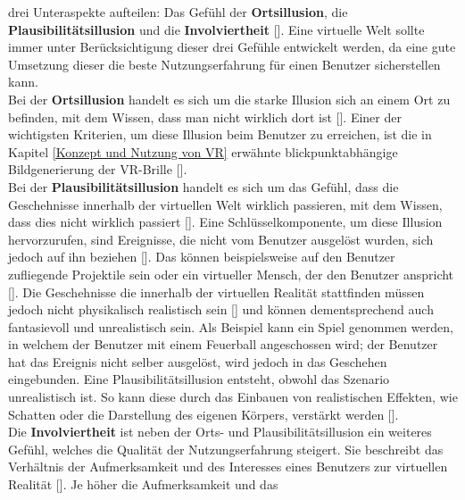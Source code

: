 \documentclass[a4paper,12pt,oneside]{article}
\begin{document}
        drei Unteraspekte aufteilen: Das Gefühl der \textbf{Ortsillusion}, die \textbf{Plausibilitätsillusion}
        und die \textbf{Involviertheit} [\cite[18-19]{Dorner2013}]. Eine virtuelle Welt sollte immer unter
        Berücksichtigung dieser drei Gefühle entwickelt werden, da eine gute Umsetzung
        dieser die beste Nutzungserfahrung für einen Benutzer sicherstellen kann. \\
        Bei der 
        \textbf{Ortsillusion} handelt es sich um die starke Illusion sich an einem Ort zu befinden, 
        mit dem Wissen, dass man nicht wirklich dort ist [\cite{Slater2009}]. 
        Einer der wichtigsten
        Kriterien, um diese Illusion beim Benutzer zu erreichen, ist die in Kapitel 
        \ref{Konzept und Nutzung von VR}
        erwähnte blickpunktabhängige Bildgenerierung der VR-Brille [\cite[18]{Dorner2013}]. \\
        Bei der \textbf{Plausibilitätsillusion} handelt
        es sich um das Gefühl, dass die Geschehnisse innerhalb der virtuellen Welt 
        wirklich passieren, mit dem Wissen, dass dies nicht wirklich passiert
        [\cite{Slater2009}]. Eine Schlüsselkomponente, um diese Illusion hervorzurufen,
        sind Ereignisse, die nicht vom Benutzer ausgelöst wurden, sich jedoch auf ihn
        beziehen [\cite{Slater2009}]. Das können beispielsweise auf den Benutzer zufliegende
        Projektile sein oder ein virtueller Mensch, der den Benutzer anspricht
        [\cite[18-19]{Dorner2013}]. Die Geschehnisse die innerhalb der virtuellen Realität
        stattfinden müssen jedoch nicht physikalisch realistisch sein [\cite{Slater2009}]
        und können dementsprechend auch fantasievoll und unrealistisch sein. Als Beispiel kann
        ein Spiel genommen werden, in welchem der Benutzer mit einem 
        Feuerball angeschossen wird; der Benutzer hat das Ereignis nicht selber ausgelöst,
        wird jedoch in das Geschehen eingebunden. Eine Plausibilitätsillusion entsteht,
        obwohl das Szenario unrealistisch ist. So kann diese durch das
        Einbauen von realistischen Effekten, wie Schatten oder die Darstellung des eigenen
        Körpers, verstärkt werden [\cite{Slater2009}]. \\
        Die \textbf{Involviertheit} ist neben der Orts- und Plausibilitätsillusion ein weiteres
        Gefühl, welches die Qualität der Nutzungserfahrung steigert. Sie
        beschreibt das Verhältnis der Aufmerksamkeit und des Interesses eines Benutzers zur
        virtuellen Realität [\cite[227]{Witmer1998}]. Je höher die Aufmerksamkeit und das
\end{document}
